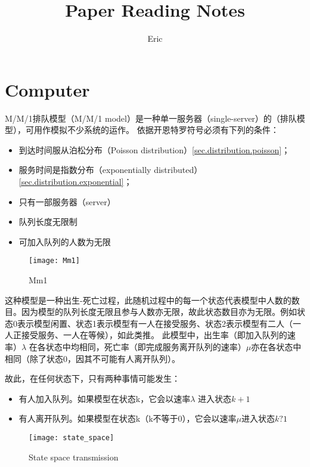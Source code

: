 \documentclass[openany]{book}
\begin{document}
\title{Paper Reading Notes}
\author{Eric}
\maketitle
\tableofcontents
\frontmatter

\part{Computer}
M/M/1排队模型（M/M/1 model）是一种单一服务器（single-server）的（排队模型），可用作模拟不少系统的运作。
依据开恩特罗符号必须有下列的条件：
\begin{itemize}
\item 到达时间服从泊松分布（Poisson distribution）\ref{sec.distribution.poisson}；
\item 服务时间是指数分布（exponentially distributed）\ref{sec.distribution.exponential}；
\item 只有一部服务器（server）
\item 队列长度无限制
\item 可加入队列的人数为无限
\end{itemize}
\begin{figure}[htbp]
  \centering
  \texttt{[image: Mm1]}\\
  \caption{Mm1}\label{fig.Mm1}
\end{figure}

这种模型是一种出生-死亡过程，此随机过程中的每一个状态代表模型中人数的数目。因为模型的队列长度无限且参与人数亦无限，故此状态数目亦为无限。例如状态0表示模型闲置、状态1表示模型有一人在接受服务、状态2表示模型有二人（一人正接受服务、一人在等候），如此类推。 此模型中，出生率（即加入队列的速率）$\lambda$ 在各状态中均相同，死亡率（即完成服务离开队列的速率）$\mu$亦在各状态中相同（除了状态0，因其不可能有人离开队列）。

故此，在任何状态下，只有两种事情可能发生：
\begin{itemize}
\item 有人加入队列。如果模型在状态k，它会以速率$\lambda$ 进入状态$k + 1$
\item 有人离开队列。如果模型在状态k（k不等于0），它会以速率$\mu$进入状态$k ? 1$
\end{itemize}
\begin{figure}[htbp]
  \centering
  \texttt{[image: state\_space]}\\
  \caption{State space transmission}\label{fig.state_space}
\end{figure}
\end{document}
